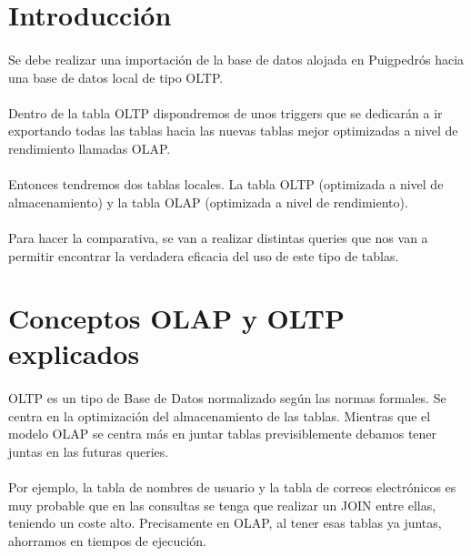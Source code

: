 \documentclass[a4paper 
,twoside
]{article}
\begin{document}


\newpage\thispagestyle{empty}
{
  \pagestyle{empty}
  \tableofcontents
  \clearpage
}

\section{Introducción}
  \paragraph{}
  Se debe realizar una importación de la base de datos alojada en Puigpedrós hacia una base de datos local de tipo OLTP.
  \paragraph{}
  Dentro de la tabla OLTP dispondremos de unos triggers que se dedicarán a ir exportando todas las tablas hacia las nuevas tablas mejor optimizadas a nivel de rendimiento llamadas OLAP.
  \paragraph{}
  Entonces tendremos dos tablas locales. La tabla OLTP (optimizada a nivel de almacenamiento) y la tabla OLAP (optimizada a nivel de rendimiento).
  \paragraph{}
  Para hacer la comparativa, se van a realizar distintas queries que nos van a permitir encontrar la verdadera eficacia del uso de este tipo de tablas.

\pagebreak
\section{Conceptos OLAP y OLTP explicados}
  \paragraph{}
  OLTP es un tipo de Base de Datos normalizado según las normas formales. Se centra en la optimización del almacenamiento de las tablas. Mientras que el modelo OLAP se centra más en juntar tablas previsiblemente debamos tener juntas en las futuras queries. 
  \paragraph{}
  Por ejemplo, la tabla de nombres de usuario y la tabla de correos electrónicos es muy probable que en las consultas se tenga que realizar un JOIN entre ellas, teniendo un coste alto. Precisamente en OLAP, al tener esas tablas ya juntas, ahorramos en tiempos de ejecución.
\end{document}
